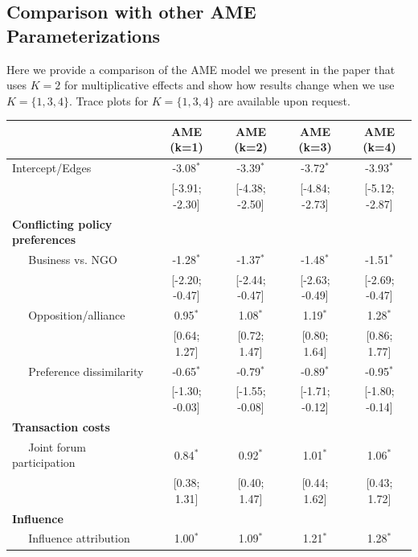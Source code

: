 \documentclass[12pt,pdflatex]{elsarticle}
\begin{document}
\FloatBarrier

\clearpage
\subsection{Comparison with other AME Parameterizations}
\label{sec:ameVsAmeAppendix}

Here we provide a comparison of the AME model we present in the paper that uses $K=2$ for multiplicative effects and show how results change when we use $K=\{1,3,4\}$. Trace plots for $K=\{1,3,4\}$ are available upon request.

\begin{table}[ht]
\centering
\begingroup\tiny
\begin{tabular}{lcccc}
   & AME (k=1) & AME (k=2) & AME (k=3) & AME (k=4) \\ 
  \hline
\hline
Intercept/Edges & -3.08$^{\ast}$ & -3.39$^{\ast}$ & -3.72$^{\ast}$ & -3.93$^{\ast}$ \\ 
   & [-3.91; -2.30] & [-4.38; -2.50] & [-4.84; -2.73] & [-5.12; -2.87] \\ 
  \textbf{Conflicting policy preferences} &  &  &  &  \\ 
  $\;\;\;\;$ Business vs. NGO & -1.28$^{\ast}$ & -1.37$^{\ast}$ & -1.48$^{\ast}$ & -1.51$^{\ast}$ \\ 
   & [-2.20; -0.47] & [-2.44; -0.47] & [-2.63; -0.49] & [-2.69; -0.47] \\ 
  $\;\;\;\;$ Opposition/alliance & 0.95$^{\ast}$ & 1.08$^{\ast}$ & 1.19$^{\ast}$ & 1.28$^{\ast}$ \\ 
   & [0.64; 1.27] & [0.72; 1.47] & [0.80; 1.64] & [0.86; 1.77] \\ 
  $\;\;\;\;$ Preference dissimilarity & -0.65$^{\ast}$ & -0.79$^{\ast}$ & -0.89$^{\ast}$ & -0.95$^{\ast}$ \\ 
   & [-1.30; -0.03] & [-1.55; -0.08] & [-1.71; -0.12] & [-1.80; -0.14] \\ 
  \textbf{Transaction costs} &  &  &  &  \\ 
  $\;\;\;\;$ Joint forum participation & 0.84$^{\ast}$ & 0.92$^{\ast}$ & 1.01$^{\ast}$ & 1.06$^{\ast}$ \\ 
   & [0.38; 1.31] & [0.40; 1.47] & [0.44; 1.62] & [0.43; 1.72] \\ 
  \textbf{Influence} &  &  &  &  \\ 
  $\;\;\;\;$ Influence attribution & 1.00$^{\ast}$ & 1.09$^{\ast}$ & 1.21$^{\ast}$ & 1.28$^{\ast}$ \\ 

\end{tabular}
\end{table}
\end{document}
